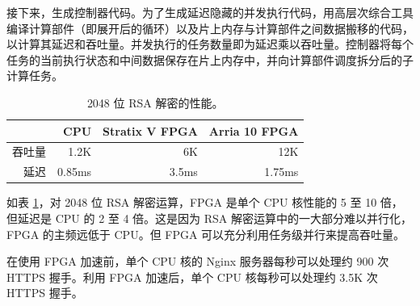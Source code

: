 接下来，\name 生成控制器代码。为了生成延迟隐藏的并发执行代码，\name 用高层次综合工具编译计算部件（即展开后的循环）以及片上内存与计算部件之间数据搬移的代码，以计算其延迟和吞吐量。并发执行的任务数量即为延迟乘以吞吐量。控制器将每个任务的当前执行状态和中间数据保存在片上内存中，并向计算部件调度拆分后的子计算任务。


\begin{table}[htbp]
	\centering
	\caption{2048 位 RSA 解密的性能。}
	\label{clicknp:tab:https-rsa}
	\small
	\begin{tabular}{r|r|r|r}
		\toprule
		 & CPU & Stratix V FPGA & Arria 10 FPGA \\
		\midrule
吞吐量 & 1.2K & 6K & 12K \\
延迟 & 0.85ms & 3.5ms & 1.75ms \\
		\bottomrule
	\end{tabular}
\end{table}

如表 \ref{clicknp:tab:https-rsa}，对 2048 位 RSA 解密运算，FPGA 是单个 CPU 核性能的 5 至 10 倍，但延迟是 CPU 的 2 至 4 倍。这是因为 RSA 解密运算中的一大部分难以并行化，FPGA 的主频远低于 CPU。但 FPGA 可以充分利用任务级并行来提高吞吐量。

在使用 FPGA 加速前，单个 CPU 核的 Nginx 服务器每秒可以处理约 900 次 HTTPS 握手。利用 FPGA 加速后，单个 CPU 核每秒可以处理约 3.5K 次 HTTPS 握手。

